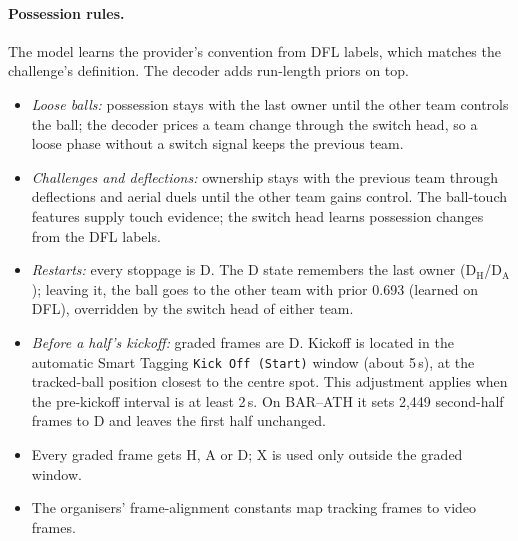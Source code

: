 \documentclass[10pt,a4paper,twocolumn]{article}
\begin{document}
\paragraph{Possession rules.} The model learns the provider's convention from DFL labels, which
matches the challenge's definition. The decoder adds
run-length priors on top.
\begin{itemize}
  \item \emph{Loose balls:} possession stays with the last owner until the other team controls the
        ball; the decoder prices a team change through the switch head, so a loose phase without a
        switch signal keeps the previous team.
  \item \emph{Challenges and deflections:} ownership stays with the previous team through
        deflections and aerial duels until the other team gains control. The ball-touch features
        supply touch evidence; the switch head learns possession changes from the DFL labels.
  \item \emph{Restarts:} every stoppage is D. The D state remembers the last owner
        ($\mathrm D_{\mathrm H}$/$\mathrm D_{\mathrm A}$); leaving it, the ball goes to the other
        team with prior 0.693 (learned on DFL), overridden by the switch head of either team.
  \item \emph{Before a half's kickoff:} graded frames are D. Kickoff is located in the automatic
        Smart Tagging \texttt{Kick Off (Start)} window (about 5\,s), at the tracked-ball position
        closest to the centre spot. This adjustment applies when the pre-kickoff interval is at
        least 2\,s. On BAR--ATH it sets 2{,}449 second-half frames to D and leaves the first half
        unchanged.
  \item Every graded frame gets H, A or D; X is used only outside the graded window.
  \item The organisers' frame-alignment constants map tracking frames to video frames.
\end{itemize}
\end{document}
